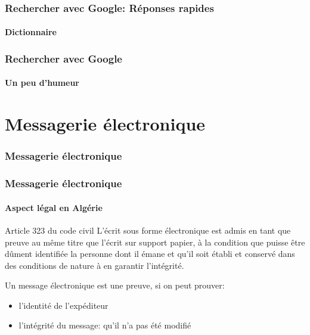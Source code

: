 \documentclass[xcolor=table]{beamer}
\begin{document}
\begin{frame}
\frametitle{Rechercher avec Google: Réponses rapides}
\framesubtitle{Dictionnaire}

\begin{center}
\end{center}

\end{frame}

\begin{frame}
\frametitle{Rechercher avec Google}
\framesubtitle{Un peu d'humeur}

\begin{center}
\end{center}

\end{frame}


\section{Messagerie électronique}

\begin{frame}
\frametitle{Messagerie électronique}

\begin{center}
\end{center}

\end{frame}

\begin{frame}
\frametitle{Messagerie électronique}
\framesubtitle{Aspect légal en Algérie}


\begin{block}{Article 323 du code civil}
	L'écrit sous forme électronique est admis en tant que preuve au même titre que l'écrit sur support papier, à la condition que puisse être dûment identifiée la personne dont il émane et qu’il soit établi et conservé dans des conditions de nature à en garantir l'intégrité.
\end{block}

Un message électronique est une preuve, si on peut prouver: 
\begin{itemize}
	\item l'identité de l'expéditeur 
	\item l'intégrité du message: qu'il n'a pas été modifié 
\end{itemize} 

\end{frame}
\end{document}
